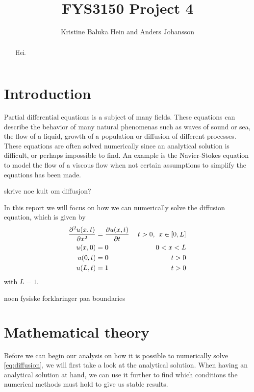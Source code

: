 \documentclass[12pt,english,a4paper]{article}
\title{FYS3150 Project 4}
\author{Kristine Baluka Hein and Anders Johansson}
\begin{document}

\pagestyle{fancy}
\tableofcontents

\begin{abstract}
Hei.
\end{abstract}
\clearpage

\section{Introduction}
Partial differential equations is a subject of many fields. These equations can describe the behavior of many natural phenomenas such as waves of sound or sea, the flow of a liquid, growth of a population or diffusion of different processes. \\
These equations are often solved numerically since an analytical solution is difficult, or perhaps impossible to find. An example is the Navier-Stokes equation to model the flow of a viscous flow when not certain assumptions to simplify the equations has been made. \\ 
\begin{center}
skrive noe kult om diffusjon?
\end{center}
In this report we will focus on how we can numerically solve the diffusion equation, which is given by
\begin{equation}\label{eq:diffusion}
\begin{aligned}
\pdv[2]{u(x,t)}{x} &= \pdv{u(x,t)}{t} &\: t>0, \:\:x\in[0,L] \\
u(x,0) &= 0  &0 < x < L\\
u(0,t) &= 0 &t>0 \\
u(L,t) &= 1&t>0
\end{aligned}
\end{equation}
with \(L = 1\).
\begin{center}
noen fysiske forklaringer paa boundaries
\end{center}

\section{Mathematical theory}
Before we can begin our analysis on how it is possible to numerically solve \vref{eq:diffusion}, we will first take a look at the analytical solution. When having an analytical solution at hand, we can use it further to find which conditions the numerical methods must hold to give us stable results. 
\end{document}
